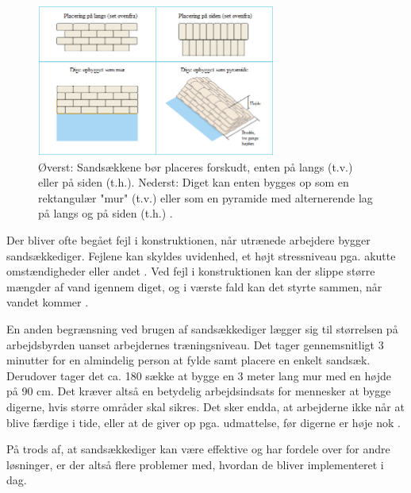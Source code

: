 \begin{figure}[H]
    \centering
    \includegraphics[width=0.7\textwidth]{figures/Sandsaekkediger.png}
    \caption{Øverst: Sandsækkene bør placeres forskudt, enten på langs (t.v.) eller på siden (t.h.). Nederst: Diget kan enten bygges op som en rektangulær "mur" (t.v.) eller som en pyramide med alternerende lag på langs og på siden (t.h.) \cite{environmentagency2009}.}
    \label{sandsaekkediger}
\end{figure}

Der bliver ofte begået fejl i konstruktionen, når utrænede arbejdere bygger sandsækkediger. Fejlene kan skyldes uvidenhed, et højt stressniveau pga. akutte omstændigheder eller andet \cite{fema2013}\cite{campbell2017}. Ved fejl i konstruktionen kan der slippe større mængder af vand igennem diget, og i værste fald kan det styrte sammen, når vandet kommer \cite{environmentagency2009}. 
\par
En anden begrænsning ved brugen af sandsækkediger lægger sig til størrelsen på arbejdsbyrden uanset arbejdernes træningsniveau. Det tager gennemsnitligt 3 minutter for en almindelig person at fylde samt placere en enkelt sandsæk. Derudover tager det ca. 180 sække at bygge en 3 meter lang mur med en højde på 90 cm\cite{hutchison2018}. Det kræver altså en betydelig arbejdsindsats for mennesker at bygge digerne, hvis større områder skal sikres. Det sker endda, at arbejderne ikke når at blive færdige i tide, eller at de giver op pga. udmattelse, før digerne er høje nok \cite{campbell2017}. 
\par
På trods af, at sandsækkediger kan være effektive og har fordele over for andre løsninger, er der altså flere problemer med, hvordan de bliver implementeret i dag.

